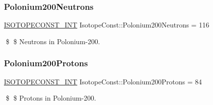 \subsubsection{\texorpdfstring{Polonium200\+Neutrons}{Polonium200Neutrons}}
{\footnotesize\ttfamily \mbox{\hyperlink{group___isotope_const-_macros_ga5f18360b3e99483a35c32d789e62621c}{I\+S\+O\+T\+O\+P\+E\+C\+O\+N\+S\+T\+\_\+\+I\+NT}} Isotope\+Const\+::\+Polonium200\+Neutrons = 116}

\$ \$ Neutrons in Polonium-\/200. \mbox{\label{group___isotope_const-_polonium-_po200_ga4b39674a87e48f158c6a6fe8867342ea}} 
\subsubsection{\texorpdfstring{Polonium200\+Protons}{Polonium200Protons}}
{\footnotesize\ttfamily \mbox{\hyperlink{group___isotope_const-_macros_ga5f18360b3e99483a35c32d789e62621c}{I\+S\+O\+T\+O\+P\+E\+C\+O\+N\+S\+T\+\_\+\+I\+NT}} Isotope\+Const\+::\+Polonium200\+Protons = 84}

\$ \$ Protons in Polonium-\/200. 